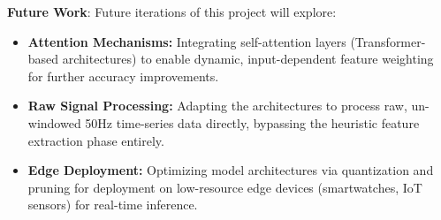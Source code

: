 \documentclass[12pt,a4paper]{article}
\begin{document}
\textbf{Future Work}: Future iterations of this project will explore:
\begin{itemize}
    \item \textbf{Attention Mechanisms:} Integrating self-attention layers (Transformer-based architectures) to enable dynamic, input-dependent feature weighting for further accuracy improvements.
    \item \textbf{Raw Signal Processing:} Adapting the architectures to process raw, un-windowed 50Hz time-series data directly, bypassing the heuristic feature extraction phase entirely.
    \item \textbf{Edge Deployment:} Optimizing model architectures via quantization and pruning for deployment on low-resource edge devices (smartwatches, IoT sensors) for real-time inference.
\end{itemize}
\end{document}
